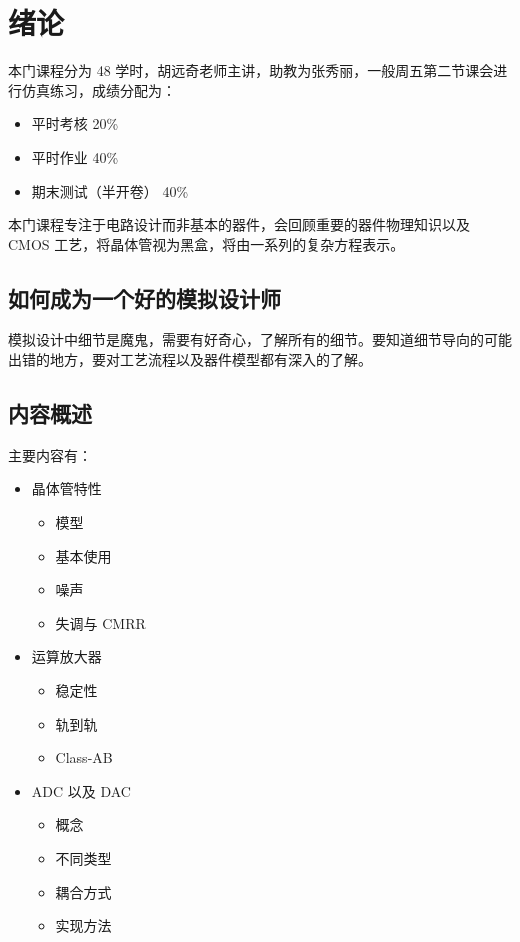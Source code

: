 \documentclass[cn,11pt,chinese,black,simple]{../elegantbook}
\begin{document}
\fi 
\def\chapname{00intro}

\chapter{绪论}

本门课程分为 48 学时，胡远奇老师主讲，助教为张秀丽，一般周五第二节课会进行仿真练习，成绩分配为：

\begin{itemize}
    \item 平时考核 20\%
    \item 平时作业 40\%
    \item 期末测试（半开卷） 40\% 
\end{itemize}

本门课程专注于电路设计而非基本的器件，会回顾重要的器件物理知识以及 CMOS 工艺，将晶体管视为黑盒，将由一系列的复杂方程表示。

\section{如何成为一个好的模拟设计师}

模拟设计中细节是魔鬼，需要有好奇心，了解所有的细节。要知道细节导向的可能出错的地方，要对工艺流程以及器件模型都有深入的了解。

\section{内容概述}

主要内容有：

\begin{itemize}
    \item 晶体管特性
    \begin{itemize}
        \item 模型
        \item 基本使用
        \item 噪声
        \item 失调与 CMRR
    \end{itemize}
    \item 运算放大器
    \begin{itemize}
        \item 稳定性
        \item 轨到轨
        \item Class-AB
    \end{itemize}
    \item ADC 以及 DAC
    \begin{itemize}
        \item 概念
        \item 不同类型
        \item 耦合方式
        \item 实现方法
    \end{itemize}
\end{itemize}


\let\chapname\undefined
\ifx\mainclass\undefined
\end{document}
